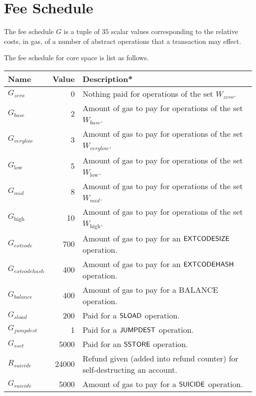 

\section{Fee Schedule}\label{app:fees}

The fee schedule $G$ is a tuple of $35$ scalar values corresponding to the relative costs, in gas, of a number of abstract operations that a transaction may effect.

The fee schedule for core space is list as follows. 

\begin{center}
	\begin{tabu}{l r l}
		\toprule
		Name & Value & Description* \\
		\midrule
		$G_{zero}$ & 0 & Nothing paid for operations of the set {\small $W_{zero}$}. \\
		$G_{base}$ & 2 & Amount of gas to pay for operations of the set {\small $W_{base}$}. \\
		$G_{verylow}$ & 3 & Amount of gas to pay for operations of the set {\small $W_{verylow}$}. \\
		$G_{\mathrm{low}}$ & 5 & Amount of gas to pay for operations of the set {\small $W_{\mathrm{low}}$}. \\
		$G_{mid}$ & 8 & Amount of gas to pay for operations of the set {\small $W_{mid}$}. \\
		$G_{\mathrm{high}}$ & 10 & Amount of gas to pay for operations of the set {\small $W_{\mathrm{high}}$}. \\
		$G_{extcode}$ & 700 & Amount of gas to pay for an $\mathsf{EXTCODESIZE}$ operation. \\
		$G_{extcodehash}$ & 400 & Amount of gas to pay for an $\mathsf{EXTCODEHASH}$ operation. \\
		$G_{balance}$ & 400 & Amount of gas to pay for a {\small BALANCE} operation. \\
		$G_{sload}$ & 200 & Paid for a $\mathsf{SLOAD}$ operation. \\
		$G_{jumpdest}$ & 1 & Paid for a $\mathsf{JUMPDEST}$ operation. \\
		$G_{sset}$ & 5000 & Paid for an $\mathsf{SSTORE}$ operation. \\
		$R_{suicide}$ & 24000 & Refund given (added into refund counter) for self-destructing an account. \\
		$G_{suicide}$ & 5000 & Amount of gas to pay for a $\mathsf{SUICIDE}$ operation. \\

\end{tabu}
\end{center}
